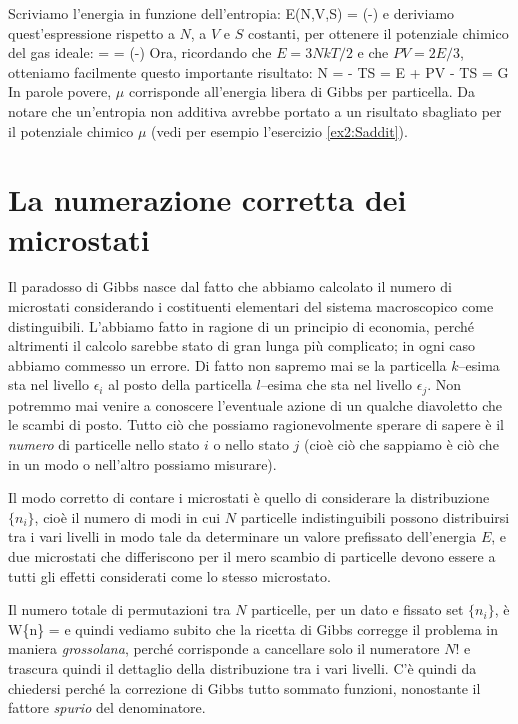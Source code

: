 Scriviamo l'energia in funzione dell'entropia:
\be
\label{eq:efs}
E(N,V,S) = \exp\left(-\right)
\ee
e deriviamo quest'espressione rispetto a $N$, a $V$ e $S$ costanti, per ottenere il potenziale chimico del gas ideale:
\be
\label{eq:mudef}
\mu =  = \left(-\right)
\ee
Ora, ricordando che $E = 3NkT/2$ e che $PV = 2E/3$, otteniamo facilmente questo importante risultato:
\be
\label{eq:muG}
\mu N =  - TS = E + PV - TS = G
\ee
In parole povere, $\mu$ corrisponde all'energia libera di Gibbs per particella. Da notare che un'entropia non additiva avrebbe portato a un risultato sbagliato per il potenziale chimico $\mu$ (vedi per esempio l'esercizio \ref{ex2:Saddit}).

\section{La numerazione corretta dei microstati}

Il paradosso di Gibbs nasce dal fatto che abbiamo calcolato il numero di microstati considerando i costituenti elementari del sistema macroscopico come distinguibili. L'abbiamo fatto in ragione di un principio di economia, perché altrimenti il calcolo sarebbe stato di gran lunga più complicato; in ogni caso abbiamo commesso un errore. Di fatto non sapremo mai se la particella $k$--esima sta nel livello $\epsilon_{i}$ al posto della particella $l$--esima che sta nel livello $\epsilon_{j}$. Non potremmo mai venire a conoscere l'eventuale azione di un qualche diavoletto che le scambi di posto. Tutto ciò che possiamo ragionevolmente sperare di sapere è il {\em numero} di particelle nello stato $i$ o nello stato $j$ (cioè ciò che sappiamo è ciò che in un modo o nell'altro possiamo misurare).

Il modo corretto di contare i microstati è quello di considerare la distribuzione $\{n_{i}\}$, cioè il numero di modi in cui $N$ particelle indistinguibili possono distribuirsi tra i vari livelli in modo tale da determinare un valore prefissato dell'energia $E$, e due microstati che differiscono per il mero scambio di particelle devono essere a tutti gli effetti considerati come lo stesso microstato.

Il numero totale di permutazioni tra $N$ particelle, per un dato e fissato set $\{n_{i}\}$, è
\be
W\{n\} = 
\ee
e quindi vediamo subito che la ricetta di Gibbs corregge il problema in maniera {\em grossolana}, perché corrisponde a cancellare solo il numeratore $N!$ e trascura quindi il dettaglio della distribuzione tra i vari livelli. C'è quindi da chiedersi perché la correzione di Gibbs tutto sommato funzioni, nonostante il fattore {\em spurio} del denominatore.

